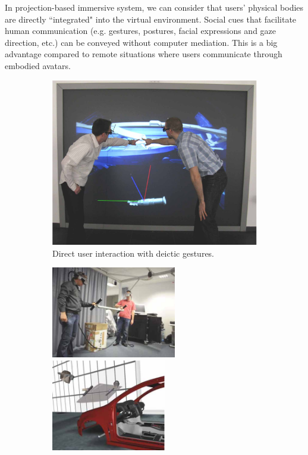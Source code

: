 In projection-based immersive system, we can consider that users' physical bodies are directly ``integrated" into the virtual environment. Social cues that facilitate human communication (e.g. gestures, postures, facial expressions and gaze direction, etc.) can be conveyed without computer mediation. This is a big advantage compared to remote situations where users communicate through embodied avatars. 

\begin{figure}[htb]
  \begin{subfigure}{.3\textwidth}
    \centering
    \includegraphics[width=\linewidth]{figures/ch2/pointing}
    \caption{Direct user interaction with deictic gestures.}
    \label{fig:2_consistent_collab:pointing}
  \end{subfigure}
  \begin{subfigure}{.7\textwidth}
    \centering
    \includegraphics[height=4cm]{figures/ch2/tangible_1}
    \includegraphics[height=4cm]{figures/ch2/tangible_2}

\end{subfigure}
\end{figure}
